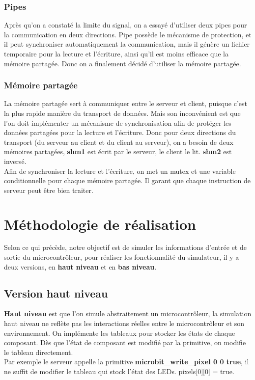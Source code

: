 \documentclass[14px]{article}
\begin{document}
	\subsubsection{Pipes}
	Après qu'on a constaté la limite du signal, on a essayé d'utiliser deux pipes pour la communication en deux directions. Pipe possède le mécanisme de protection, et il peut synchroniser automatiquement la communication, mais il 	génère un fichier temporaire pour la lecture et l'écriture, ainsi qu’il est moins efficace que la mémoire partagée. Donc on a finalement décidé d'utiliser la mémoire partagée.
	
	\subsubsection{Mémoire partagée}
	La mémoire partagée sert à communiquer entre le serveur et client, puisque c'est la plus rapide manière du transport de données. Mais son inconvénient est que l'on doit implémenter un mécanisme de synchronisation afin de protéger les données partagées pour la lecture et l'écriture. Donc pour deux directions du transport (du serveur au client et du client au serveur), on a besoin de deux mémoires partagées, \textbf{shm1} est écrit par le serveur, le client le lit. \textbf{shm2} est inversé.\\
	
	Afin de synchroniser la lecture et l'écriture, on met un mutex et une variable conditionnelle pour chaque mémoire partagée. Il garant que chaque instruction de serveur peut être bien traiter.\\
	
	
	
	
	\clearpage
	\pagestyle{fancy}
	\rhead{\thepage}
	\fancyfoot{}
	
	\section{Méthodologie de réalisation}
	Selon ce qui précède, notre objectif est de simuler les informations d'entrée et de sortie du microcontrôleur, pour réaliser les fonctionnalité du simulateur, il y a deux versions, en \textbf{haut niveau} et en \textbf{bas niveau}.
	
	\subsection{Version haut niveau}
	\textbf{Haut niveau} est que l'on simule abstraitement un microcontrôleur, la simulation haut niveau ne reflète pas les interactions réelles entre le microcontrôleur et son environnement. On implémente les tableaux pour stocker les états de chaque composant. Dès que l'état de composant est modifié par la primitive, on modifie le tableau directement.\\
	Par exemple le serveur appelle la primitive \textbf{microbit\_write\_pixel 0 0 true}, il ne suffit de modifier le tableau qui stock l'état des LEDs. pixels[0][0] = true.\\
	
\end{document}
